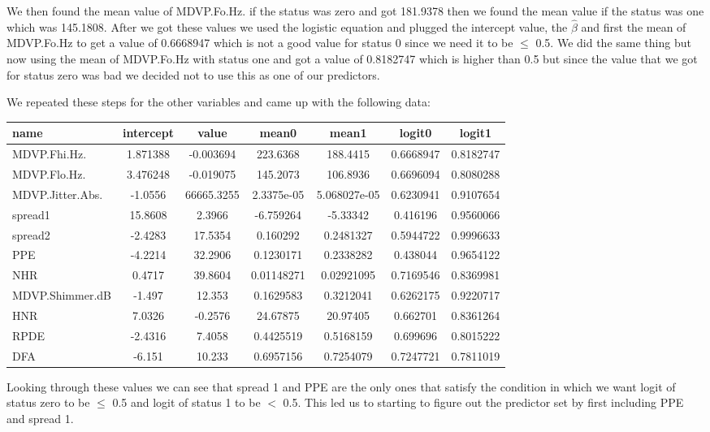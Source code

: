 \documentclass{article}
\begin{document}
We then found the mean value of MDVP.Fo.Hz. if the status was zero and got 181.9378 then we found the mean value if the status was one which was 145.1808. After we got these values we used the logistic equation and plugged the intercept value, the $\hat{\beta}$ and first the mean of MDVP.Fo.Hz to get a value of 0.6668947 which is not a good value for status 0 since we need it to be $\leq$ 0.5. We did the same thing but now using the mean of MDVP.Fo.Hz with status one and got a value of 0.8182747 which is higher than 0.5 but since the value that we got for status zero was bad we decided not to use this as one of our predictors.

We repeated these steps for the other variables and came up with the following data:

\begin{tabular}{l|c|c|c|c|c|c}
name & intercept & value & mean0 & mean1 & logit0 & logit1 \\
\hline
MDVP.Fhi.Hz. & 1.871388 & -0.003694 & 223.6368 & 188.4415 & 0.6668947 & 0.8182747 \\
\hline
MDVP.Flo.Hz. & 3.476248 & -0.019075 & 145.2073 & 106.8936 & 0.6696094 & 0.8080288 \\
\hline
MDVP.Jitter.Abs. & -1.0556 & 66665.3255 & 2.3375e-05 & 5.068027e-05 & 0.6230941 & 0.9107654 \\
\hline
spread1 & 15.8608 & 2.3966 & -6.759264 & -5.33342 & 0.416196 & 0.9560066 \\
\hline
spread2 & -2.4283 & 17.5354 & 0.160292 & 0.2481327 & 0.5944722 & 0.9996633 \\
\hline
PPE & -4.2214 & 32.2906 & 0.1230171 & 0.2338282 & 0.438044 & 0.9654122 \\
\hline
NHR & 0.4717 & 39.8604 & 0.01148271 & 0.02921095 & 0.7169546 & 0.8369981 \\
\hline
MDVP.Shimmer.dB & -1.497 & 12.353 & 0.1629583 & 0.3212041 & 0.6262175 & 0.9220717 \\
\hline
HNR & 7.0326 & -0.2576 & 24.67875 & 20.97405 & 0.662701 & 0.8361264 \\
\hline
RPDE & -2.4316 & 7.4058 & 0.4425519 & 0.5168159 & 0.699696 & 0.8015222 \\
\hline
DFA & -6.151 & 10.233 & 0.6957156 & 0.7254079 & 0.7247721 & 0.7811019 \\
\hline
\end{tabular}

Looking through these values we can see that spread 1 and PPE are the only ones that satisfy the condition in which we want logit of status zero to be $\leq$ 0.5 and logit of status 1 to be $<$ 0.5. This led us to starting to figure out the predictor set by first including PPE and spread 1.
\end{document}
